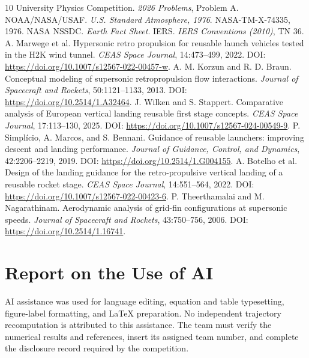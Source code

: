 \documentclass[11pt,a4paper]{article}
\begin{document}
\clearpage
{}
{}
\begin{thebibliography}{10}
\small
{} University Physics Competition. \emph{2026 Problems}, Problem A.
 NOAA/NASA/USAF. \emph{U.S. Standard Atmosphere, 1976}. NASA-TM-X-74335, 1976.
 NASA NSSDC. \emph{Earth Fact Sheet}.
 IERS. \emph{IERS Conventions (2010)}, TN 36.
 A. Marwege et al. Hypersonic retro propulsion for reusable launch vehicles tested in the H2K wind tunnel. \emph{CEAS Space Journal}, 14:473--499, 2022. DOI: \url{https://doi.org/10.1007/s12567-022-00457-w}.
 A. M. Korzun and R. D. Braun. Conceptual modeling of supersonic retropropulsion flow interactions. \emph{Journal of Spacecraft and Rockets}, 50:1121--1133, 2013. DOI: \url{https://doi.org/10.2514/1.A32464}.
 J. Wilken and S. Stappert. Comparative analysis of European vertical landing reusable first stage concepts. \emph{CEAS Space Journal}, 17:113--130, 2025. DOI: \url{https://doi.org/10.1007/s12567-024-00549-9}.
 P. Simpl\'{i}cio, A. Marcos, and S. Bennani. Guidance of reusable launchers: improving descent and landing performance. \emph{Journal of Guidance, Control, and Dynamics}, 42:2206--2219, 2019. DOI: \url{https://doi.org/10.2514/1.G004155}.
 A. Botelho et al. Design of the landing guidance for the retro-propulsive vertical landing of a reusable rocket stage. \emph{CEAS Space Journal}, 14:551--564, 2022. DOI: \url{https://doi.org/10.1007/s12567-022-00423-6}.
 P. Theerthamalai and M. Nagarathinam. Aerodynamic analysis of grid-fin configurations at supersonic speeds. \emph{Journal of Spacecraft and Rockets}, 43:750--756, 2006. DOI: \url{https://doi.org/10.2514/1.16741}.
\end{thebibliography}

\clearpage
\section*{Report on the Use of AI}
AI assistance was used for language editing, equation and table typesetting, figure-label formatting, and LaTeX preparation. No independent trajectory recomputation is attributed to this assistance. The team must verify the numerical results and references, insert its assigned team number, and complete the disclosure record required by the competition.
\end{document}
